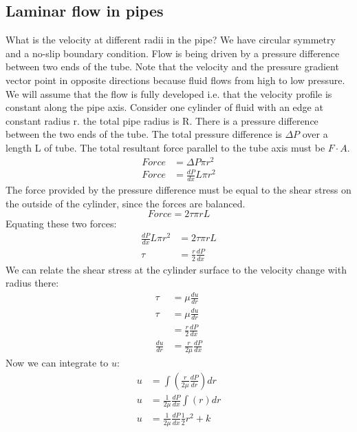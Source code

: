 \subsection{Laminar flow in pipes}
What is the velocity at different radii in the pipe? We have circular symmetry and a no-slip boundary condition. Flow is being driven by a pressure difference between two ends of the tube. Note that the velocity and the pressure gradient vector point in opposite directions because fluid flows from high to low pressure. We will assume that the flow is fully developed i.e. that the velocity profile is constant along the pipe axis. Consider one cylinder of fluid with an edge at constant radius r. the total pipe radius is R. There is a pressure difference between the two ends of the tube. The total pressure difference is \(\Delta P\) over a length L of tube. The total resultant force parallel to the tube axis must be \(F\cdot A\).
\begin{align}
  Force & = \Delta P \pi r^2      \\
  Force & = \frac{dP}{dx}L\pi r^2
\end{align}
The force provided by the pressure difference must be equal to the shear stress on the outside of the cylinder, since the forces are balanced.
\begin{equation}
  Force = 2\tau \pi r L
\end{equation}
Equating these two forces:
\begin{align}
  \frac{dP}{dx}L\pi r^2 & = 2\tau \pi r L             \\
  \tau                  & = \frac{r}{2} \frac{dP}{dx}
\end{align}
We can relate the shear stress at the cylinder surface to the velocity change with radius there:
\begin{align}
  \tau          & = \mu \frac{du}{dr}            \\
  \tau          & = \mu \frac{du}{dr}            \\
                & = \frac{r}{2} \frac{dP}{dx}    \\
  \frac{du}{dr} & = \frac{r}{2\mu} \frac{dP}{dx}
\end{align}
Now we can integrate to \(u\):
\begin{align}
  u & = \int \left( \frac{r}{2\mu} \frac{dP}{dr} \right) dr \\
  u & = \frac{1}{2\mu} \frac{dP}{dx} \int (r) dr            \\
  u & = \frac{1}{2\mu} \frac{dP}{dx} \frac{1}{2}r^2 +k
\end{align}
